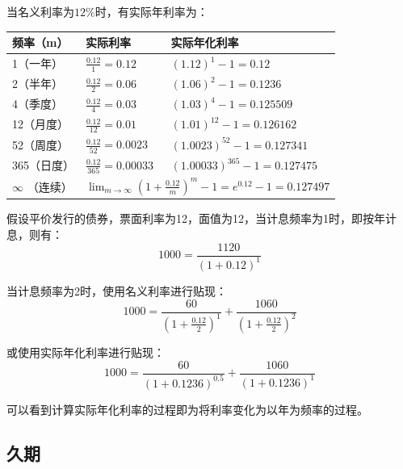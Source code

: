 \documentclass[11pt]{article}
\begin{document}
\begin{example}
    当名义利率为$12\%$时，有实际年利率为：
    \begin{table}[H]
    \centering
    \begin{tabular}{@{}lll@{}}
    \toprule
    频率（m） & 实际利率 & 实际年化利率 \\ \midrule
    1（一年）   & $\frac{0.12}{1}=0.12$  & $(1.12)^1-1=0.12$ \\
    2（半年）   & $\frac{0.12}{2}=0.06$  & $(1.06)^2-1=0.1236$      \\
    4（季度）   & $\frac{0.12}{4}=0.03$  & $(1.03)^4-1=0.125509$       \\
    12（月度）  & $\frac{0.12}{12}=0.01$ & $(1.01)^{12}-1=0.126162$ \\
    52（周度）  & $\frac{0.12}{52}=0.0023$  & $(1.0023)^{52}-1=0.127341$\\
    365（日度） & $\frac{0.12}{365}=0.00033$ & $(1.00033)^{365}-1=0.127475$ \\
    $\infty$ （连续）  & \multicolumn{2}{l}{$ \lim_{m \rightarrow \infty} (1+\frac{0.12}{m})^{m} - 1 = e^{0.12} - 1 = 0.127497
    $}            \\ \bottomrule
    \end{tabular}
    \end{table}
\end{example}

假设平价发行的债券，票面利率为12，面值为12，当计息频率为1时，即按年计息，则有：
\begin{equation*}
    1000 = \frac{1120}{(1+0.12)^1}
\end{equation*}

当计息频率为2时，使用名义利率进行贴现：
\begin{equation*}
    1000 = \frac{60}{(1+\frac{0.12}{2})^1} + \frac{1060}{(1+\frac{0.12}{2})^2}
\end{equation*}

或使用实际年化利率进行贴现：
\begin{equation*}
    1000 = \frac{60}{(1+0.1236)^{0.5}} + \frac{1060}{(1+0.1236)^1}
\end{equation*}

可以看到计算实际年化利率的过程即为将利率变化为以年为频率的过程。

\subsection{久期}
\end{document}

